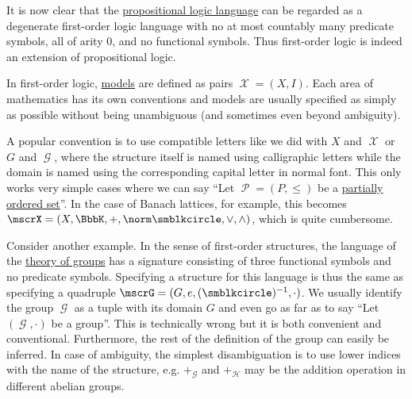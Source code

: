 \begin{remark}\label{rem:propositional_logic_as_first_order_logic}
  It is now clear that the \hyperref[subsec:propositional_logic]{propositional logic language} can be regarded as a degenerate first-order logic language with no at most countably many predicate symbols, all of arity \( 0 \), and no functional symbols. Thus first-order logic is indeed an extension of propositional logic.
\end{remark}

\begin{remark}\label{rem:first_order_model_notation}
  In first-order logic, \hyperref[def:first_order_semantics/satisfiability]{models} are defined as pairs \( \mscrX = (X, I) \). Each area of mathematics has its own conventions and models are usually specified as simply as possible without being unambiguous (and sometimes even beyond ambiguity).

  A popular convention is to use compatible letters like we did with \( X \) and \( \mscrX \) or \( G \) and \( \mscrG \), where the structure itself is named using calligraphic letters while the domain is named using the corresponding capital letter in normal font. This only works very simple cases where we can say \enquote{Let \( \mscrP = (P, \leq) \) be a \hyperref[def:partially_ordered_set]{partially ordered set}}. In the case of Banach lattices, for example, this becomes \( \mscrX = (X, \BbbK, +, \norm \placeholder, \vee, \wedge) \), which is quite cumbersome.

  Consider another example. In the sense of first-order structures, the language of the \hyperref[def:group/theory]{theory of groups} has a signature consisting of three functional symbols and no predicate symbols. Specifying a structure for this language is thus the same as specifying a quadruple \( \mscrG = (G, e, (\placeholder)^{-1}, \cdot) \). We usually identify the group \( \mscrG \) as a tuple with its domain \( G \) and even go as far as to say \enquote{Let \( (\mscrG, \cdot) \) be a group}. This is technically wrong but it is both convenient and conventional. Furthermore, the rest of the definition of the group can easily be inferred. In case of ambiguity, the simplest disambiguation is to use lower indices with the name of the structure, e.g. \( +_\mscrG \) and \( +_\mscrH \) may be the addition operation in different abelian groups.
\end{remark}
